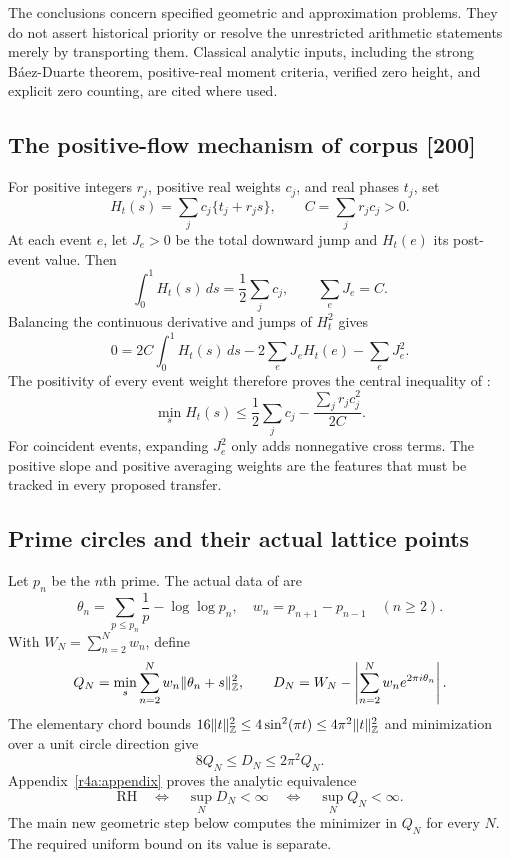 \documentclass[11pt,a4paper]{article}
\theoremstyle{definition}\newtheorem{definition}[theorem]{Definition}
\theoremstyle{remark}\newtheorem{remark}[theorem]{Remark}
\numberwithin{equation}{section}
\begin{document}
The conclusions concern specified geometric and approximation
problems. They do not assert historical priority or resolve the
unrestricted arithmetic statements merely by transporting them.
Classical analytic inputs, including the strong
B\'aez-Duarte theorem, positive-real moment criteria, verified
zero height, and explicit zero counting, are cited where used.

\subsection{The positive-flow mechanism of corpus [200]}

For positive integers $r_j$, positive real weights $c_j$, and real
phases $t_j$, set
\[
 H_t(s)=\sum_jc_j\{t_j+r_js\},\qquad C=\sum_jr_jc_j>0.
\]
At each event $e$, let $J_e>0$ be the total downward jump and
$H_t(e)$ its post-event value. Then
\[
 \int_0^1H_t(s)\,ds=\frac12\sum_jc_j,\qquad
 \sum_eJ_e=C.
\]
Balancing the continuous derivative and jumps of $H_t^2$ gives
\[
 0=2C\int_0^1H_t(s)\,ds
       -2\sum_eJ_eH_t(e)-\sum_eJ_e^2.
\]
The positivity of every event weight therefore proves the central
inequality of \cite{VMRC200}:
\begin{equation}\label{r5:flow}
 \min_sH_t(s)\le
 \frac12\sum_jc_j-\frac{\sum_jr_jc_j^2}{2C}.
\end{equation}
For coincident events, expanding $J_e^2$ only adds nonnegative
cross terms. The positive slope and positive averaging weights
are the features that must be tracked in every proposed transfer.

\subsection{Prime circles and their actual lattice points}

Let $p_n$ be the $n$th prime. The actual data of \cite{PrimeCircles}
are
\[
 \theta_n=\sum_{p\le p_n}\frac1p-\log\log p_n,\quad
 w_n=p_{n+1}-p_{n-1}\quad(n\ge2).
\]
With $W_N=\sum_{n=2}^Nw_n$, define
\[
 Q_N=\min_s\sum_{n=2}^Nw_n\|\theta_n+s\|_{\mathbb Z}^2,\qquad
 D_N=W_N-\left|\sum_{n=2}^Nw_ne^{2\pi i\theta_n}\right|.
\]
The elementary chord bounds
$16\|t\|_{\mathbb Z}^2\le4\sin^2(\pi t)\le4\pi^2\|t\|_{\mathbb Z}^2$
and minimization over a unit circle direction give
\begin{equation}\label{r5:primecomparison}
 8Q_N\le D_N\le2\pi^2Q_N.
\end{equation}
Appendix~\ref{r4a:appendix} proves the analytic equivalence
\[
 \mathrm{RH}\quad\Longleftrightarrow\quad
 \sup_ND_N<\infty
 \quad\Longleftrightarrow\quad \sup_NQ_N<\infty.
\]
The main new geometric step below computes the minimizer in $Q_N$
for every $N$. The required uniform bound on its value is separate.
\end{document}

